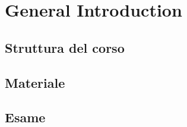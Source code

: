 \documentclass[../main.tex]{subfiles}
\begin{document}
\clearpage
\thispagestyle{empty}
\vspace*{7cm}
\section{General Introduction}
\vspace*{1.5cm}



\subsection{Struttura del corso}




\subsection{Materiale}



\subsection{Esame}
\end{document}
